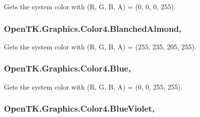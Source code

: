 Gets the system color with (R, G, B, A) = (0, 0, 0, 255). 

\hypertarget{struct_open_t_k_1_1_graphics_1_1_color4_aeaacaa1714eebce3bd224e2fb4f6e040}{
\subsubsection[{Blanched\-Almond}]{ Open\-T\-K.\-Graphics.\-Color4.\-Blanched\-Almond\hspace{0.3cm}{\ttfamily [static]}, {\ttfamily [get]}}}\label{struct_open_t_k_1_1_graphics_1_1_color4_aeaacaa1714eebce3bd224e2fb4f6e040}


Gets the system color with (R, G, B, A) = (255, 235, 205, 255). 

\hypertarget{struct_open_t_k_1_1_graphics_1_1_color4_ab796fa9830cd7593fbe9c13146d2aac2}{
\subsubsection[{Blue}]{ Open\-T\-K.\-Graphics.\-Color4.\-Blue\hspace{0.3cm}{\ttfamily [static]}, {\ttfamily [get]}}}\label{struct_open_t_k_1_1_graphics_1_1_color4_ab796fa9830cd7593fbe9c13146d2aac2}


Gets the system color with (R, G, B, A) = (0, 0, 255, 255). 

\hypertarget{struct_open_t_k_1_1_graphics_1_1_color4_adcd73651a42a8f1fc4c2e9559a375a96}{
\subsubsection[{Blue\-Violet}]{ Open\-T\-K.\-Graphics.\-Color4.\-Blue\-Violet\hspace{0.3cm}{\ttfamily [static]}, {\ttfamily [get]}}}\label{struct_open_t_k_1_1_graphics_1_1_color4_adcd73651a42a8f1fc4c2e9559a375a96}


